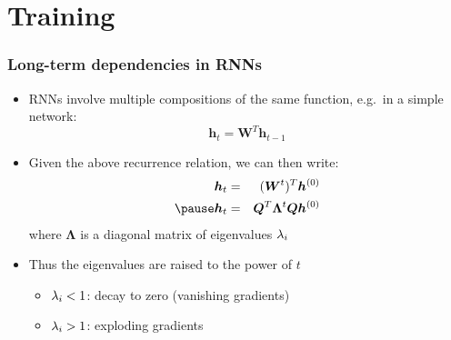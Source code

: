 \documentclass[smaller]{beamer}
\begin{document}
\section{Training}
\begin{frame}
  \frametitle{Long-term dependencies in RNNs}
  \pause
  \begin{itemize}
  \item RNNs involve multiple compositions of the same function, e.g.\ in a simple network: \pause
    \begin{equation}
      \bm{h}_{t} = \bm{W}^{T}\bm{h}_{t-1}
    \end{equation}
    \pause
  \item Given the above recurrence relation, we can then write:\pause
    \begin{eqnarray}
      \bm{h}_{t} &=& (\bm{W}^{t})^{T}\bm{h}^{(0)} \\\pause
      \bm{h}_{t} &=& \bm{Q}^{T}\bm{\Lambda}^{t}\bm{Q}\bm{h}^{(0)} 
    \end{eqnarray}
    \pause
    where $\bm\Lambda$ is a diagonal matrix of eigenvalues $\lambda_{i}$
    \pause
  \item Thus the eigenvalues are raised to the power of $t$\pause
    \begin{itemize}
    \item $\lambda_{i} < 1$: decay to zero (vanishing gradients)
    \item $\lambda_{i} > 1$: exploding gradients 
    \end{itemize}
  \end{itemize}
\end{frame}
\end{document}
